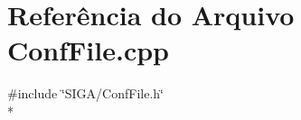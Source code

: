 \section{Referência do Arquivo Conf\+File.\+cpp}
\label{_conf_file_8cpp}
{\ttfamily \#include \char`\"{}S\+I\+G\+A/\+Conf\+File.\+h\char`\"{}}\\*
